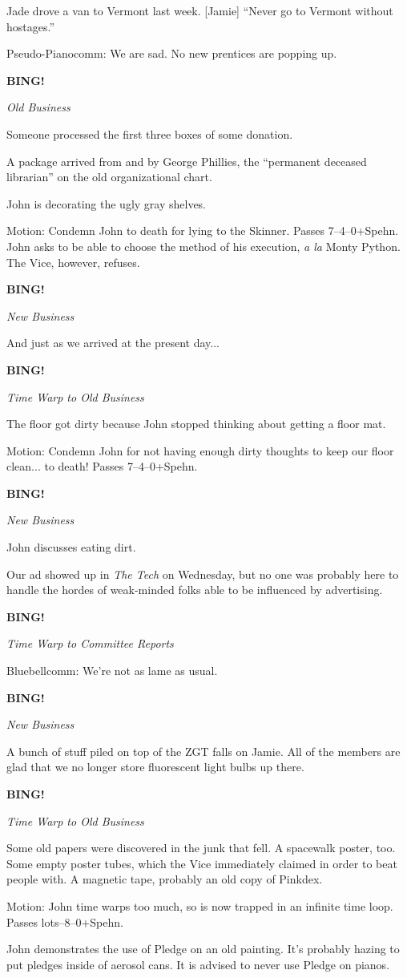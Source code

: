 \documentclass[12pt]{article}
\newcommand{\bing}{{\bf BING!} }
\newcommand{\goto}[1]{\bing \vskip 12pt \centerline{{\em{#1}}}}
\begin{document}
Jade drove a van to Vermont last week.  [Jamie] ``Never go to Vermont
without hostages.''

Pseudo-Pianocomm: We are sad.  No new prentices are popping up.

\goto{Old Business}

Someone processed the first three boxes of some donation.

A package arrived from and by George Phillies, the ``permanent
deceased librarian'' on the old organizational chart.

John is decorating the ugly gray shelves.

Motion: Condemn John to death for lying to the Skinner.  Passes
7--4--0+Spehn.  John asks to be able to choose the method of his
execution, {\em a la} Monty Python.  The Vice, however, refuses.

\goto{New Business}

And just as we arrived at the present day...

\goto{Time Warp to Old Business}

The floor got dirty because John stopped thinking about getting a
floor mat.

Motion: Condemn John for not having enough dirty thoughts to keep
our floor clean... to death!  Passes 7--4--0+Spehn.

\goto{New Business}

John discusses eating dirt.

Our ad showed up in {\em The Tech} on Wednesday, but no one was
probably here to handle the hordes of weak-minded folks able to
be influenced by advertising.

\goto{Time Warp to Committee Reports}

Bluebellcomm: We're not as lame as usual.

\goto{New Business}

A bunch of stuff piled on top of the ZGT falls on Jamie.  All of the
members are glad that we no longer store fluorescent light bulbs up
there.

\goto{Time Warp to Old Business}

Some old papers were discovered in the junk that fell.  A spacewalk
poster, too.  Some empty poster tubes, which the Vice immediately
claimed in order to beat people with.  A magnetic tape, probably an
old copy of Pinkdex.

Motion: John time warps too much, so is now trapped in an infinite
time loop.  Passes lots--8--0+Spehn.

John demonstrates the use of Pledge on an old painting.  It's
probably hazing to put pledges inside of aerosol cans.  It is advised
to never use Pledge on pianos.
\end{document}
